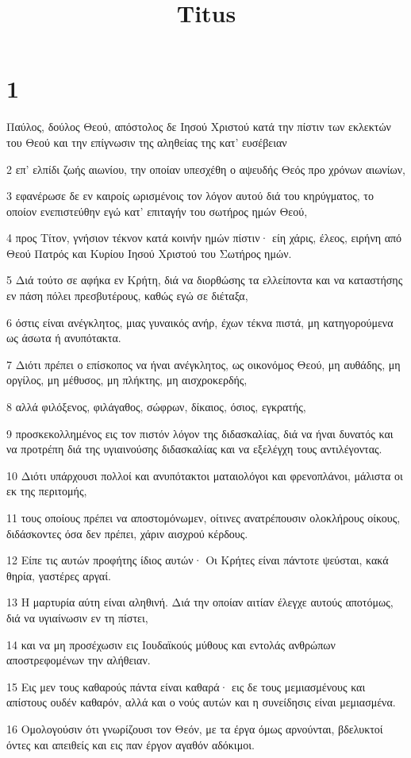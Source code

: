 

\title{Titus}


\chapter{1}

\par Παύλος, δούλος Θεού, απόστολος δε Ιησού Χριστού κατά την πίστιν των εκλεκτών του Θεού και την επίγνωσιν της αληθείας της κατ' ευσέβειαν
\par 2 επ' ελπίδι ζωής αιωνίου, την οποίαν υπεσχέθη ο αψευδής Θεός προ χρόνων αιωνίων,
\par 3 εφανέρωσε δε εν καιροίς ωρισμένοις τον λόγον αυτού διά του κηρύγματος, το οποίον ενεπιστεύθην εγώ κατ' επιταγήν του σωτήρος ημών Θεού,
\par 4 προς Τίτον, γνήσιον τέκνον κατά κοινήν ημών πίστιν· είη χάρις, έλεος, ειρήνη από Θεού Πατρός και Κυρίου Ιησού Χριστού του Σωτήρος ημών.
\par 5 Διά τούτο σε αφήκα εν Κρήτη, διά να διορθώσης τα ελλείποντα και να καταστήσης εν πάση πόλει πρεσβυτέρους, καθώς εγώ σε διέταξα,
\par 6 όστις είναι ανέγκλητος, μιας γυναικός ανήρ, έχων τέκνα πιστά, μη κατηγορούμενα ως άσωτα ή ανυπότακτα.
\par 7 Διότι πρέπει ο επίσκοπος να ήναι ανέγκλητος, ως οικονόμος Θεού, μη αυθάδης, μη οργίλος, μη μέθυσος, μη πλήκτης, μη αισχροκερδής,
\par 8 αλλά φιλόξενος, φιλάγαθος, σώφρων, δίκαιος, όσιος, εγκρατής,
\par 9 προσκεκολλημένος εις τον πιστόν λόγον της διδασκαλίας, διά να ήναι δυνατός και να προτρέπη διά της υγιαινούσης διδασκαλίας και να εξελέγχη τους αντιλέγοντας.
\par 10 Διότι υπάρχουσι πολλοί και ανυπότακτοι ματαιολόγοι και φρενοπλάνοι, μάλιστα οι εκ της περιτομής,
\par 11 τους οποίους πρέπει να αποστομόνωμεν, οίτινες ανατρέπουσιν ολοκλήρους οίκους, διδάσκοντες όσα δεν πρέπει, χάριν αισχρού κέρδους.
\par 12 Είπε τις αυτών προφήτης ίδιος αυτών· Οι Κρήτες είναι πάντοτε ψεύσται, κακά θηρία, γαστέρες αργαί.
\par 13 Η μαρτυρία αύτη είναι αληθινή. Διά την οποίαν αιτίαν έλεγχε αυτούς αποτόμως, διά να υγιαίνωσιν εν τη πίστει,
\par 14 και να μη προσέχωσιν εις Ιουδαϊκούς μύθους και εντολάς ανθρώπων αποστρεφομένων την αλήθειαν.
\par 15 Εις μεν τους καθαρούς πάντα είναι καθαρά· εις δε τους μεμιασμένους και απίστους ουδέν καθαρόν, αλλά και ο νούς αυτών και η συνείδησις είναι μεμιασμένα.
\par 16 Ομολογούσιν ότι γνωρίζουσι τον Θεόν, με τα έργα όμως αρνούνται, βδελυκτοί όντες και απειθείς και εις παν έργον αγαθόν αδόκιμοι.

